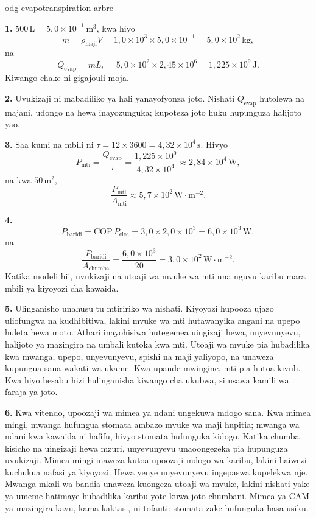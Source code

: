 \begin{exo}{odg-evapotranspiration-arbre}
\begin{solution}
\textbf{1.} $500\,\text{L}=5{,}0\times10^{-1}\,\text{m}^3$, kwa hiyo
\[
m=\rho_{\text{maji}}V=1{,}0\times10^3\times5{,}0\times10^{-1}=5{,}0\times10^2\,\text{kg},
\]
na
\[
Q_{\mathrm{evap}}=mL_v=5{,}0\times10^2\times2{,}45\times10^6=1{,}225\times10^9\,\text{J}.
\]
Kiwango chake ni gigajouli moja.

\textbf{2.} Uvukizaji ni mabadiliko ya hali yanayofyonza joto. Nishati $Q_{\mathrm{evap}}$ hutolewa na majani, udongo na hewa inayozunguka; kupoteza joto huku hupunguza halijoto yao.

\textbf{3.} Saa kumi na mbili ni $\tau=12\times3600=4{,}32\times10^4\,\text{s}$. Hivyo
\[
P_{\text{mti}}=\frac{Q_{\mathrm{evap}}}{\tau}
=\frac{1{,}225\times10^9}{4{,}32\times10^4}
\approx2{,}84\times10^4\,\text{W},
\]
na kwa $50\,\text{m}^2$,
\[
\frac{P_{\text{mti}}}{A_{\text{mti}}}\approx5{,}7\times10^2\,\text{W}\!\cdot\!\text{m}^{-2}.
\]

\textbf{4.}
\[
P_{\text{baridi}}=\mathrm{COP}\,P_{\mathrm{elec}}=3{,}0\times2{,}0\times10^3=6{,}0\times10^3\,\text{W},
\]
na
\[
\frac{P_{\text{baridi}}}{A_{\text{chumba}}}=\frac{6{,}0\times10^3}{20}=3{,}0\times10^2\,\text{W}\!\cdot\!\text{m}^{-2}.
\]
Katika modeli hii, uvukizaji na utoaji wa mvuke wa mti una nguvu karibu mara mbili ya kiyoyozi cha kawaida.

\textbf{5.} Ulinganisho unahusu tu mtiririko wa nishati. Kiyoyozi hupooza ujazo uliofungwa na kudhibitiwa, lakini mvuke wa mti hutawanyika angani na upepo huleta hewa moto. Athari inayohisiwa hutegemea uingizaji hewa, unyevunyevu, halijoto ya mazingira na umbali kutoka kwa mti. Utoaji wa mvuke pia hubadilika kwa mwanga, upepo, unyevunyevu, spishi na maji yaliyopo, na unaweza kupungua sana wakati wa ukame. Kwa upande mwingine, mti pia hutoa kivuli. Kwa hiyo hesabu hizi hulinganisha kiwango cha ukubwa, si usawa kamili wa faraja ya joto.

\textbf{6.} Kwa vitendo, upoozaji wa mimea ya ndani ungekuwa mdogo sana. Kwa mimea mingi, mwanga hufungua stomata ambazo mvuke wa maji hupitia; mwanga wa ndani kwa kawaida ni hafifu, hivyo stomata hufunguka kidogo. Katika chumba kisicho na uingizaji hewa mzuri, unyevunyevu unaoongezeka pia hupunguza uvukizaji. Mimea mingi inaweza kutoa upoozaji mdogo wa karibu, lakini haiwezi kuchukua nafasi ya kiyoyozi. Hewa yenye unyevunyevu ingepaswa kupelekwa nje. Mwanga mkali wa bandia unaweza kuongeza utoaji wa mvuke, lakini nishati yake ya umeme hatimaye hubadilika karibu yote kuwa joto chumbani. Mimea ya CAM ya mazingira kavu, kama kaktasi, ni tofauti: stomata zake hufunguka hasa usiku.
\end{solution}
\end{exo}


